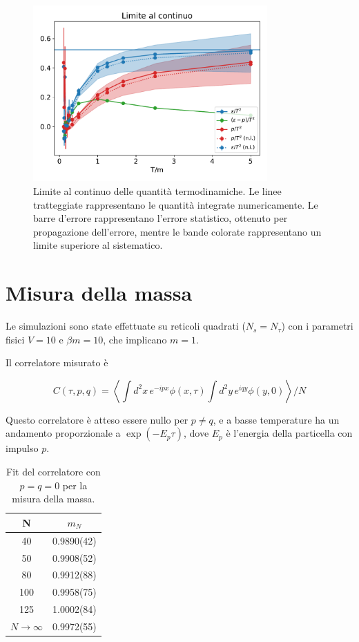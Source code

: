 \documentclass[a4paper,11pt]{article}
\newcommand{\avg}[1]{\left\langle {#1} \right\rangle}
\begin{document}
    \begin{figure}[htb]
        \centering
        \includegraphics[width=0.8\textwidth]{figures/continuum.pdf}
        \caption{Limite al continuo delle quantità termodinamiche. Le linee tratteggiate rappresentano le quantità integrate numericamente. Le barre d'errore rappresentano l'errore statistico, ottenuto per propagazione dell'errore, mentre le bande colorate rappresentano un limite superiore al sistematico.}
        \label{fig:thermo_continuum}
    \end{figure}

    

    
    \section{Misura della massa}
   
    Le simulazioni sono state effettuate su reticoli quadrati ($N_s = N_\tau$) con i parametri fisici $V = 10$ e $\beta m = 10$, che implicano $m = 1$. 
    
    Il correlatore misurato è
    
    \begin{equation}
        C(\tau, p, q) = \avg{\int d^2 x \, e^{-ipx} \phi(x,\tau) \int d^2 y \, e^{iqy} \phi(y, 0)} / N
    \end{equation}
    
    Questo correlatore è atteso essere nullo per $p \neq q$, e a basse temperature ha un andamento proporzionale a $\exp (- E_p \tau)$, dove $E_p$ è l'energia della particella con impulso $p$.
    
    
    \begin{table}
        \begin{tabular}{c c} \hline
        N & $m_N$ \\ \hline
        40 &    0.9890(42)  \\
        50 &    0.9908(52)   \\
        80 &    0.9912(88)  \\
        100 &   0.9958(75)  \\
        125 &   1.0002(84)  \\ \hline
        $N \to \infty$ & 0.9972(55)  \\ \hline
        \end{tabular}
    \caption{Fit del correlatore con $p = q = 0$ per la misura della massa.}
    \label{tab:mass_fit}
    \end{table}
    
\end{document}
